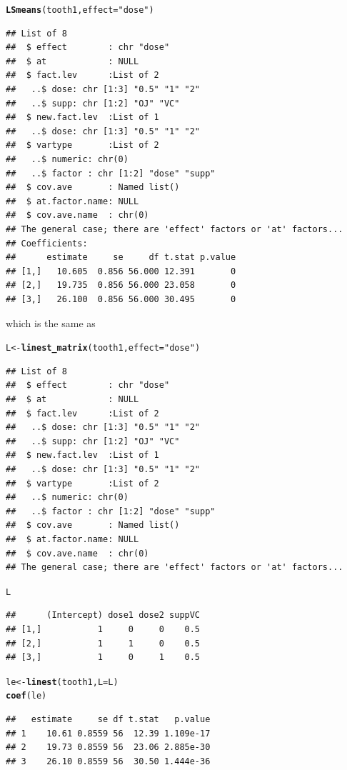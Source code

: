 \documentclass[10pt]{article}\usepackage[]{graphicx}\usepackage[]{color}
\makeatletter
\newcommand{\hlstr}[1]{\textcolor[rgb]{0.192,0.494,0.8}{#1}}%
\newcommand{\hlstd}[1]{\textcolor[rgb]{0.345,0.345,0.345}{#1}}%
\newcommand{\hlkwb}[1]{\textcolor[rgb]{0.69,0.353,0.396}{#1}}%
\newcommand{\hlkwc}[1]{\textcolor[rgb]{0.333,0.667,0.333}{#1}}%
\newcommand{\hlkwd}[1]{\textcolor[rgb]{0.737,0.353,0.396}{\textbf{#1}}}%
\newenvironment{kframe}{%
 \def\at@end@of@kframe{}%
 \ifinner\ifhmode%
  \def\at@end@of@kframe{\end{minipage}}%
  \begin{minipage}{\columnwidth}%
 \fi\fi%
 \def\FrameCommand##1{\hskip\@totalleftmargin \hskip-\fboxsep
 \colorbox{shadecolor}{##1}\hskip-\fboxsep
     \hskip-\linewidth \hskip-\@totalleftmargin \hskip\columnwidth}%
 \MakeFramed {\advance\hsize-\width
   \@totalleftmargin\z@ \linewidth\hsize
   \@setminipage}}%
 {\par\unskip\endMakeFramed%
 \at@end@of@kframe}
\newenvironment{knitrout}{}{} %
\makeatother
\begin{document}
\begin{knitrout}
\color{fgcolor}\begin{kframe}
\begin{alltt}
\hlkwd{LSmeans}\hlstd{(tooth1,} \hlkwc{effect}\hlstd{=}\hlstr{"dose"}\hlstd{)}
\end{alltt}
\begin{verbatim}
## List of 8
##  $ effect        : chr "dose"
##  $ at            : NULL
##  $ fact.lev      :List of 2
##   ..$ dose: chr [1:3] "0.5" "1" "2"
##   ..$ supp: chr [1:2] "OJ" "VC"
##  $ new.fact.lev  :List of 1
##   ..$ dose: chr [1:3] "0.5" "1" "2"
##  $ vartype       :List of 2
##   ..$ numeric: chr(0) 
##   ..$ factor : chr [1:2] "dose" "supp"
##  $ cov.ave       : Named list()
##  $ at.factor.name: NULL
##  $ cov.ave.name  : chr(0) 
## The general case; there are 'effect' factors or 'at' factors...
## Coefficients:
##      estimate     se     df t.stat p.value
## [1,]   10.605  0.856 56.000 12.391       0
## [2,]   19.735  0.856 56.000 23.058       0
## [3,]   26.100  0.856 56.000 30.495       0
\end{verbatim}
\end{kframe}
\end{knitrout}

which is the same as
\begin{knitrout}
\color{fgcolor}\begin{kframe}
\begin{alltt}
\hlstd{L} \hlkwb{<-} \hlkwd{linest_matrix}\hlstd{(tooth1,} \hlkwc{effect}\hlstd{=}\hlstr{"dose"}\hlstd{)}
\end{alltt}
\begin{verbatim}
## List of 8
##  $ effect        : chr "dose"
##  $ at            : NULL
##  $ fact.lev      :List of 2
##   ..$ dose: chr [1:3] "0.5" "1" "2"
##   ..$ supp: chr [1:2] "OJ" "VC"
##  $ new.fact.lev  :List of 1
##   ..$ dose: chr [1:3] "0.5" "1" "2"
##  $ vartype       :List of 2
##   ..$ numeric: chr(0) 
##   ..$ factor : chr [1:2] "dose" "supp"
##  $ cov.ave       : Named list()
##  $ at.factor.name: NULL
##  $ cov.ave.name  : chr(0) 
## The general case; there are 'effect' factors or 'at' factors...
\end{verbatim}
\begin{alltt}
\hlstd{L}
\end{alltt}
\begin{verbatim}
##      (Intercept) dose1 dose2 suppVC
## [1,]           1     0     0    0.5
## [2,]           1     1     0    0.5
## [3,]           1     0     1    0.5
\end{verbatim}
\begin{alltt}
\hlstd{le} \hlkwb{<-} \hlkwd{linest}\hlstd{(tooth1,} \hlkwc{L}\hlstd{=L)}
\hlkwd{coef}\hlstd{(le)}
\end{alltt}
\begin{verbatim}
##   estimate     se df t.stat   p.value
## 1    10.61 0.8559 56  12.39 1.109e-17
## 2    19.73 0.8559 56  23.06 2.885e-30
## 3    26.10 0.8559 56  30.50 1.444e-36
\end{verbatim}
\end{kframe}
\end{knitrout}
\end{document}
